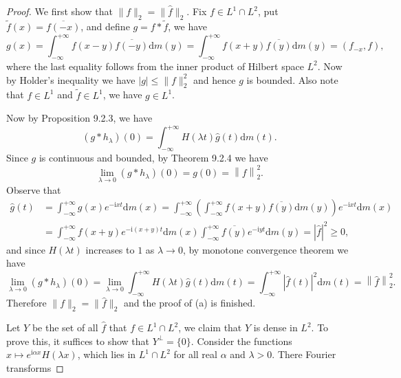 \begin{proof}
We first show that $\|f\|_2=\|\widehat{f}\|_2$. Fix $f\in L^1\cap L^2$, put $\widetilde{f}(x)=\overline{f(-x)}$, and define $g=f*\widetilde{f}$, we have 
$$
g\left( x \right) =\int_{-\infty}^{+\infty}{f\left( x-y \right) \overline{f\left( -y \right) }\mathrm{d}m\left( y \right)}=\int_{-\infty}^{+\infty}{f\left( x+y \right) \overline{f\left( y \right) }\mathrm{d}m\left( y \right)}=\left( f_{-x},f \right) ,
$$
where the last equality follows from the inner product of Hilbert space $L^2$. Now by Holder's inequality we have $|g|\le\|f\|_2^2$ and hence $g$ is bounded. Also note that $f\in L^1$ and $\widetilde{f}\in L^1$, we have $g\in L^1$.\par
Now by Proposition 9.2.3, we have 
$$
\left( g*h_{\lambda} \right) \left( 0 \right) =\int_{-\infty}^{+\infty}{H\left( \lambda t \right) \widehat{g}\left( t \right) \mathrm{d}m\left( t \right)}.
$$
Since $g$ is continuous and bounded, by Theorem 9.2.4 we have 
$$
\lim_{\lambda \rightarrow 0} \left( g*h_{\lambda} \right) \left( 0 \right) =g\left( 0 \right) =\left\| f \right\| _{2}^{2}.
$$
Observe that 
$$
\begin{aligned}
\widehat{g}\left( t \right) &=\int_{-\infty}^{+\infty}{g\left( x \right) e^{-\mathrm{i}xt}\mathrm{d}m\left( x \right)}=\int_{-\infty}^{+\infty}{\left( \int_{-\infty}^{+\infty}{f\left( x+y \right) \overline{f\left( y \right) }\mathrm{d}m\left( y \right)} \right) e^{-\mathrm{i}xt}\mathrm{d}m\left( x \right)}
\\
&=\int_{-\infty}^{+\infty}{f\left( x+y \right) e^{-\mathrm{i}\left( x+y \right) t}\mathrm{d}m\left( x \right) \int_{-\infty}^{+\infty}{\overline{f\left( y \right) }e^{-\mathrm{i}yt}\mathrm{d}m\left( y \right)}}=\left| \widehat{f} \right|^2\ge 0,
\end{aligned}
$$
and since $H(\lambda t)$ increases to $1$ as $\lambda\to 0$, by monotone convergence theorem we have 
$$
\lim_{\lambda \rightarrow 0} \left( g*h_{\lambda} \right) \left( 0 \right) =\lim_{\lambda \rightarrow 0} \int_{-\infty}^{+\infty}{H\left( \lambda t \right) \widehat{g}\left( t \right) \mathrm{d}m\left( t \right)}=\int_{-\infty}^{+\infty}{\left| \widehat{f}\left( t \right) \right|^2\mathrm{d}m\left( t \right)}=\left\| \widehat{f} \right\| _2^2.
$$
Therefore $\|f\|_2=\|\widehat{f}\|_2$ and the proof of (a) is finished.\par
Let $Y$ be the set of all $\widehat{f}$ that $f\in L^1\cap L^2$, we claim that $Y$ is dense in $L^2$. To prove this, it suffices to show that $Y^\perp=\{0\}$. Consider the functions $x\mapsto e^{\mathrm{i}\alpha x}H(\lambda x)$, which lies in $L^1\cap L^2$ for all real $\alpha$ and $\lambda>0$. There Fourier transforms 

\end{proof}
